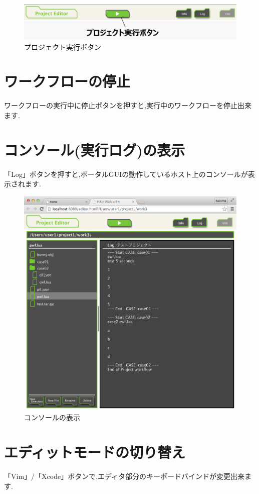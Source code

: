 \documentclass[a4paper,10pt,oneside]{jsbook}
\begin{document}
\begin{figure}[htbp]
	\begin{center}
		\includegraphics[width=12.0cm]{image/execute_project_button.png}
	\end{center}
	\caption{プロジェクト実行ボタン}
	\label{fig:execute_project_button}
\end{figure}

\section{ワークフローの停止}
ワークフローの実行中に停止ボタンを押すと,実行中のワークフローを停止出来ます.

\section{コンソール(実行ログ)の表示}
「Log」ボタンを押すと,ポータルGUIの動作しているホスト上のコンソールが表示されます.

\begin{figure}[htbp]
	\begin{center}
		\includegraphics[width=12.0cm]{image/projeditor_004.png}
	\end{center}
	\caption{コンソールの表示}
	\label{fig:projeditor_comsole}
\end{figure}

\section{エディットモードの切り替え}
「Vim」/「Xcode」ボタンで,エディタ部分のキーボードバインドが変更出来ます.
\end{document}
